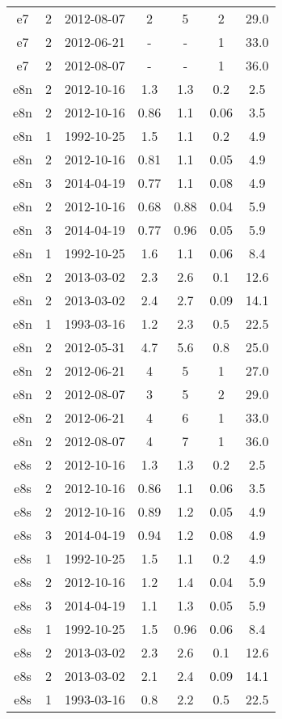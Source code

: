 \begin{table*}[htp]
\begin{tabular}{ccccccc}
e7 & 2 & 2012-08-07 & 2 & 5 & 2 & 29.0 \\
e7 & 2 & 2012-06-21 & - & - & 1 & 33.0 \\
e7 & 2 & 2012-08-07 & - & - & 1 & 36.0 \\
e8n & 2 & 2012-10-16 & 1.3 & 1.3 & 0.2 & 2.5 \\
e8n & 2 & 2012-10-16 & 0.86 & 1.1 & 0.06 & 3.5 \\
e8n & 1 & 1992-10-25 & 1.5 & 1.1 & 0.2 & 4.9 \\
e8n & 2 & 2012-10-16 & 0.81 & 1.1 & 0.05 & 4.9 \\
e8n & 3 & 2014-04-19 & 0.77 & 1.1 & 0.08 & 4.9 \\
e8n & 2 & 2012-10-16 & 0.68 & 0.88 & 0.04 & 5.9 \\
e8n & 3 & 2014-04-19 & 0.77 & 0.96 & 0.05 & 5.9 \\
e8n & 1 & 1992-10-25 & 1.6 & 1.1 & 0.06 & 8.4 \\
e8n & 2 & 2013-03-02 & 2.3 & 2.6 & 0.1 & 12.6 \\
e8n & 2 & 2013-03-02 & 2.4 & 2.7 & 0.09 & 14.1 \\
e8n & 1 & 1993-03-16 & 1.2 & 2.3 & 0.5 & 22.5 \\
e8n & 2 & 2012-05-31 & 4.7 & 5.6 & 0.8 & 25.0 \\
e8n & 2 & 2012-06-21 & 4 & 5 & 1 & 27.0 \\
e8n & 2 & 2012-08-07 & 3 & 5 & 2 & 29.0 \\
e8n & 2 & 2012-06-21 & 4 & 6 & 1 & 33.0 \\
e8n & 2 & 2012-08-07 & 4 & 7 & 1 & 36.0 \\
e8s & 2 & 2012-10-16 & 1.3 & 1.3 & 0.2 & 2.5 \\
e8s & 2 & 2012-10-16 & 0.86 & 1.1 & 0.06 & 3.5 \\
e8s & 2 & 2012-10-16 & 0.89 & 1.2 & 0.05 & 4.9 \\
e8s & 3 & 2014-04-19 & 0.94 & 1.2 & 0.08 & 4.9 \\
e8s & 1 & 1992-10-25 & 1.5 & 1.1 & 0.2 & 4.9 \\
e8s & 2 & 2012-10-16 & 1.2 & 1.4 & 0.04 & 5.9 \\
e8s & 3 & 2014-04-19 & 1.1 & 1.3 & 0.05 & 5.9 \\
e8s & 1 & 1992-10-25 & 1.5 & 0.96 & 0.06 & 8.4 \\
e8s & 2 & 2013-03-02 & 2.3 & 2.6 & 0.1 & 12.6 \\
e8s & 2 & 2013-03-02 & 2.1 & 2.4 & 0.09 & 14.1 \\
e8s & 1 & 1993-03-16 & 0.8 & 2.2 & 0.5 & 22.5 \\

\end{tabular}
\end{table*}
